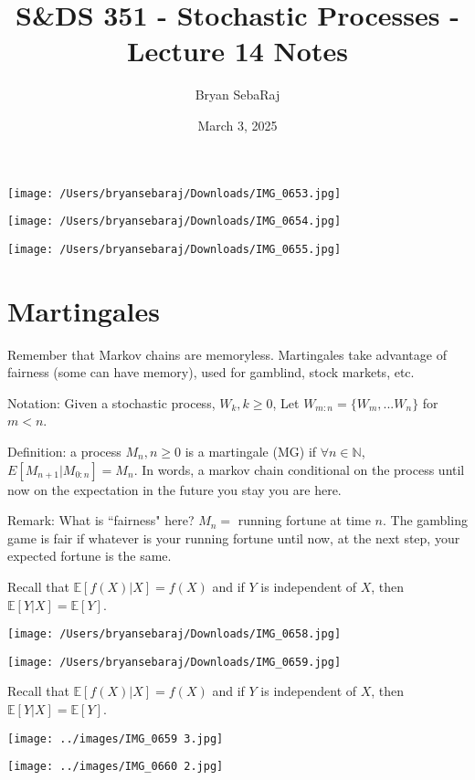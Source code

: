 \documentclass{article}
\title{S\&DS 351 - Stochastic Processes - Lecture 14 Notes}
\author{Bryan SebaRaj}
\date{March 3, 2025}
\begin{document}
\maketitle

\texttt{[image: /Users/bryansebaraj/Downloads/IMG\_0653.jpg]}

\texttt{[image: /Users/bryansebaraj/Downloads/IMG\_0654.jpg]}


\texttt{[image: /Users/bryansebaraj/Downloads/IMG\_0655.jpg]}


\section*{Martingales}

Remember that Markov chains are memoryless. 
Martingales take advantage of fairness (some can have memory), used for gamblind, stock markets, etc.

Notation: Given a stochastic process, $W_k, k \geq 0$, 
Let $W_{m:n}=\{W_m,...W_n \}$ for $m < n$. 

Definition: a process $M_n, n \geq 0$ is a martingale (MG) if $\forall n \in \mathbb{N}$, $E[M_{n+1}|M_{0:n}]=M_n$.
In words, a markov chain conditional on the process until now on the expectation in the future you stay you are here.

Remark: What is ``fairness" here?
$M_n =$ running fortune at time $n$. The gambling game is fair if whatever is your running fortune until now, at the next step, your expected fortune is the same.


Recall that $\mathbb{E}[f(X)|X]=f(X)$ and if $Y$ is independent of $X$, then $\mathbb{E}[Y|X]=\mathbb{E}[Y]$.

\texttt{[image: /Users/bryansebaraj/Downloads/IMG\_0658.jpg]}

\texttt{[image: /Users/bryansebaraj/Downloads/IMG\_0659.jpg]}

Recall that $\mathbb{E}[f(X)|X]=f(X)$ and if $Y$ is independent of $X$, then $\mathbb{E}[Y|X]=\mathbb{E}[Y]$.

\texttt{[image: ../images/IMG\_0659 3.jpg]}

\texttt{[image: ../images/IMG\_0660 2.jpg]}
\end{document}
